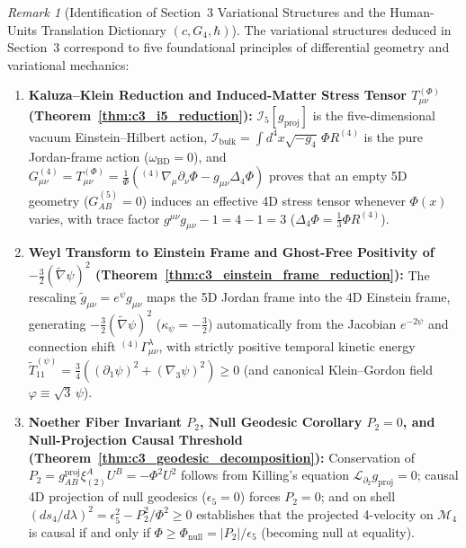 \documentclass[11pt,a4paper]{article}
\theoremstyle{definition}
\theoremstyle{plain}
\theoremstyle{remark}
\newtheorem{remark}[axiom]{Remark}
\begin{document}
\begin{remark}[{Identification of Section~3 Variational Structures and the Human-Units Translation Dictionary $(c, G_4, \hbar)$}]\label{rem:c3_variational_recognition}\label{rem:c3_human_units_dictionary}
The variational structures deduced in Section~3 correspond to five foundational principles of differential geometry and variational mechanics:
\begin{enumerate}
  \item \textbf{Kaluza--Klein Reduction and Induced-Matter Stress Tensor $T_{\mu\nu}^{(\Phi)}$ (Theorem~\ref{thm:c3_i5_reduction}):} $\mathcal{I}_5[g_{\mathrm{proj}}]$ is the five-dimensional vacuum Einstein--Hilbert action, $\mathcal{I}_{\mathrm{bulk}} = \int d^4x\sqrt{-g_4}\,\Phi R^{(4)}$ is the pure Jordan-frame action ($\omega_{\mathrm{BD}} = 0$), and $G_{\mu\nu}^{(4)} = T_{\mu\nu}^{(\Phi)} = \frac{1}{\Phi}({}^{(4)}\nabla_\mu\partial_\nu\Phi - g_{\mu\nu}\Delta_4\Phi)$ proves that an empty 5D geometry ($G_{AB}^{(5)} = 0$) induces an effective 4D stress tensor whenever $\Phi(x)$ varies, with trace factor $g^{\mu\nu}g_{\mu\nu} - 1 = 4 - 1 = 3$ ($\Delta_4\Phi = \frac{1}{3}\Phi R^{(4)}$).
  \item \textbf{Weyl Transform to Einstein Frame and Ghost-Free Positivity of $-\frac{3}{2}(\tilde{\nabla}\psi)^2$ (Theorem~\ref{thm:c3_einstein_frame_reduction}):} The rescaling $\tilde{g}_{\mu\nu} = e^\psi g_{\mu\nu}$ maps the 5D Jordan frame into the 4D Einstein frame, generating $-\frac{3}{2}(\tilde{\nabla}\psi)^2$ ($\kappa_\psi = -\frac{3}{2}$) automatically from the Jacobian $e^{-2\psi}$ and connection shift ${}^{(4)}\Gamma^\lambda_{\mu\nu}$, with strictly positive temporal kinetic energy $\tilde{T}_{11}^{(\psi)} = \frac{3}{4}((\partial_1\psi)^2 + (\nabla_3\psi)^2) \ge 0$ (and canonical Klein--Gordon field $\varphi \equiv \sqrt{3}\,\psi$).
  \item \textbf{Noether Fiber Invariant $P_2$, Null Geodesic Corollary $P_2 = 0$, and Null-Projection Causal Threshold (Theorem~\ref{thm:c3_geodesic_decomposition}):} Conservation of $P_2 = g_{AB}^{\mathrm{proj}}\xi_{(2)}^A U^B = -\Phi^2 U^2$ follows from Killing's equation $\mathcal{L}_{\partial_2}g_{\mathrm{proj}} = 0$; causal 4D projection of null geodesics ($\epsilon_5 = 0$) forces $P_2 = 0$; and on shell $(ds_4/d\lambda)^2 = \epsilon_5^2 - P_2^2/\Phi^2 \ge 0$ establishes that the projected 4-velocity on $\mathcal{M}_4$ is causal if and only if $\Phi \ge \Phi_{\mathrm{null}} = |P_2|/\epsilon_5$ (becoming null at equality).

\end{enumerate}
\end{remark}
\end{document}
